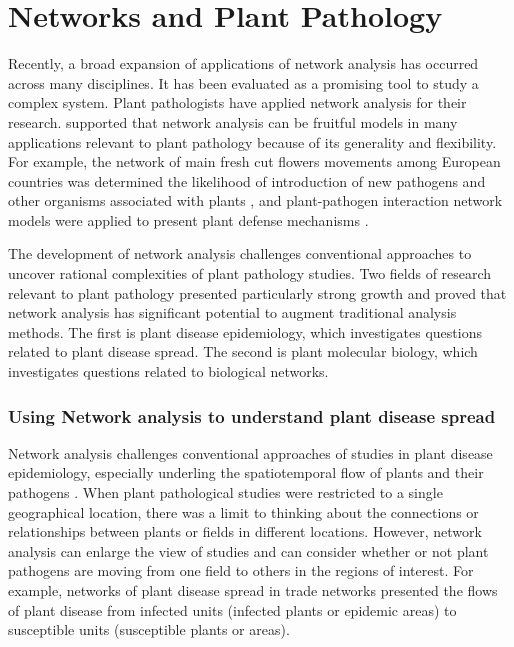 \section*{Networks and Plant Pathology}

Recently, a broad expansion of applications of network analysis has occurred across many disciplines. It has been evaluated as a promising tool to study a complex system. Plant pathologists have applied network analysis for their research. \citet{Lefebvre:2011fo, Jeger:2007tn, windram2014network} supported that network analysis can be fruitful models in many applications relevant to plant pathology because of its generality and flexibility. For example, the network of main fresh cut flowers movements among European countries was determined the likelihood of introduction of new pathogens and other organisms associated with plants \citep{eagling2007australian}, and plant-pathogen interaction network models were applied to present plant defense mechanisms \citep{dietz2010hubs}. 

The development of network analysis challenges conventional approaches to uncover rational complexities of plant pathology studies. Two fields of research relevant to plant pathology presented particularly strong growth and proved that network analysis has significant potential to augment traditional analysis methods. The first is plant disease epidemiology, which investigates questions related to plant disease spread. The second is plant molecular biology, which investigates questions related to biological networks.

\subsubsection*{Using Network analysis to understand plant disease spread}

Network analysis challenges conventional approaches of studies in plant disease epidemiology, especially underling the spatiotemporal flow of plants and their pathogens \citep{Moslonka2010}. When plant pathological studies were restricted to a single geographical location, there was a limit to thinking about the connections or relationships between plants or fields in different locations. However, network analysis can enlarge the view of studies and can consider whether or not plant pathogens are moving from one field to others in the regions of interest. For example, networks of plant disease spread in trade networks presented the flows of plant disease from infected units (infected plants or epidemic areas) to susceptible units (susceptible plants or areas).

